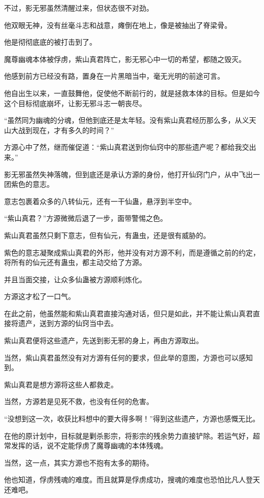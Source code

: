 \begin{this_body}
不过，影无邪虽然清醒过来，但状态很不对劲。

他双眼无神，没有丝毫斗志和战意，瘫倒在地上，像是被抽出了脊梁骨。

他是彻彻底底的被打击到了。

魔尊幽魂本体被俘虏，紫山真君阵亡，影无邪心中一切的希望，都随之毁灭。

他感到前方已经没有路，置身在一片黑暗当中，毫无光明的前途可言。

他自出生以来，一直鼓舞他，促使他不断前行的，就是拯救本体的目标。但是如今这个目标彻底崩坏，让影无邪斗志一朝丧尽。

“虽然同为幽魂的分魂，但他到底还是太年轻。没有紫山真君经历那么多，从义天山大战到现在，才有多久的时间？”

方源心中了然，继而催促道：“紫山真君送到你仙窍中的那些遗产呢？都给我交出来。”

影无邪虽然失神落魄，但到底还是承认方源的身份，他打开仙窍门户，从中飞出一团紫色的意志。

意志包裹着众多的八转仙元，还有一干仙蛊，悬浮到半空中。

“紫山真君？”方源微微后退了一步，面带警惕之色。

紫山真君虽然只剩下意志，但有仙元，有蛊虫，还是很有威胁的。

紫色的意志凝聚成紫山真君的外形，他并没有对方源不利，而是遵循之前的约定，将所有的仙元还有蛊虫，都主动交给了方源。

并且当面交接，让众多仙蛊被方源顺利炼化。

方源这才松了一口气。

在此之前，他虽然能和紫山真君直接沟通对话，但只是如此，并不能让紫山真君直接将遗产，送到方源的仙窍当中去。

紫山真君便将这些遗产，先送到影无邪的身上，再由方源取出。

当然，紫山真君虽然没有对方源有任何的要求，但此举的意图，方源也可以感知到。

紫山真君是想方源将这些人都救走。

当然，方源若是见死不救，也没有任何的危害。

“没想到这一次，收获比料想中的要大得多啊！”得到这些遗产，方源也感慨无比。

在他的原计划中，目标就是剿杀影宗，将影宗的残余势力直接铲除。若运气好，超常发挥的话，说不定能俘虏了魔尊幽魂的本体残魂。

当然，这一点，其实方源也不抱有太多的期待。

他也知道，俘虏残魂的难度。而且就算是俘虏成功，搜魂的难度也恐怕比凡人登天还难吧。

\end{this_body}

